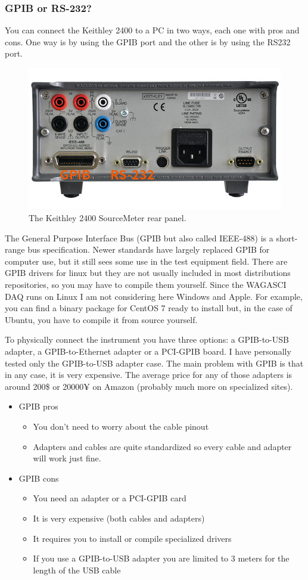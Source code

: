 \subsubsection{GPIB or RS-232?}
You can connect the Keithley 2400 to a PC in two ways, each one with pros and
cons. One way is by using the GPIB port and the other is by using the RS232
port.
\begin{figure}[ht]
  \centering \includegraphics[width=0.7\linewidth]{keithley-2400-rear-panel}
  \caption{The Keithley 2400 SourceMeter rear panel.}\label{keithley-2400-rear-panel}
\end{figure}

The General Purpose Interface Bus (GPIB but also called IEEE-488) is a
short-range bus specification. Newer standards have largely replaced GPIB for
computer use, but it still sees some use in the test equipment field. There are
GPIB drivers for linux but they are not usually included in most distributions
repositories, so you may have to compile them yourself. Since the WAGASCI DAQ
runs on Linux I am not considering here Windows and Apple. For example, you can
find a binary package for CentOS 7 ready to install but, in the case of Ubuntu,
you have to compile it from source yourself.

To physically connect the instrument you have three options: a GPIB-to-USB
adapter, a GPIB-to-Ethernet adapter or a PCI-GPIB board. I have personally
tested only the GPIB-to-USB adapter case. The main problem with GPIB is that in
any case, it is very expensive. The average price for any of those adapters is
around 200\$ or 20000¥ on Amazon (probably much more on specialized sites).
\begin{itemize}
\item GPIB pros
  \begin{itemize}
  \item You don't need to worry about the cable pinout
  \item Adapters and cables are quite standardized so every cable and adapter
    will work just fine.
  \end{itemize}
\item GPIB cons
  \begin{itemize}
  \item You need an adapter or a PCI-GPIB card
  \item It is very expensive (both cables and adapters)
  \item It requires you to install or compile specialized drivers
  \item If you use a GPIB-to-USB adapter you are limited to 3 meters for the
    length of the USB cable
  \end{itemize}
\end{itemize}

